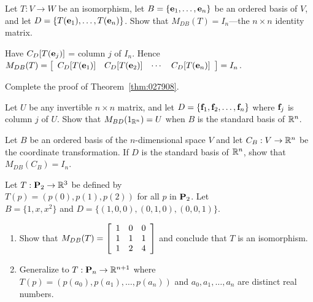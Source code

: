 \begin{multicols}{1}
\begin{ex}
Let $T : V \to W$ be an isomorphism, let $B = \{\textbf{e}_{1}, \dots, \textbf{e}_{n}\}$ be an ordered basis of $V$, and let $D = \{T(\textbf{e}_{1}), \dots, T(\textbf{e}_{n})\}$. Show that $M_{DB}(T) = I_{n}$---the $n\times n$ identity matrix.

\begin{sol}
Have $C_{D}[T(\textbf{e}_{j})]$ = column $j$ of $I_{n}$. Hence $M_{DB}(T) = \left[ \begin{array}{cccc} C_{D}[T(\textbf{e}_{1})] & C_{D}[T(\textbf{e}_{2})] & \cdots & C_{D}[T(\textbf{e}_{n})] \end{array} \right] = I_{n}$.
\end{sol}
\end{ex}

\begin{ex}\label{ex:ex9_1_13}
Complete the proof of Theorem~\ref{thm:027908}.
\end{ex}

\begin{ex}\label{ex:ex9_1_14}
Let $U$ be any invertible $n \times n$ matrix, and let $D = \{\textbf{f}_{1}, \textbf{f}_{2}, \dots, \textbf{f}_{n}\}$ where $\textbf{f}_{j}$ is column $j$ of $U$. Show that $M_{BD}(1_{\mathbb{R}^n}) = U$ when $B$ is the standard basis of $\mathbb{R}^n$.
\end{ex}

\begin{ex}
Let $B$ be an ordered basis of the $n$-dimensional space $V$ and let $C_{B} : V \to \mathbb{R}^n$ be the coordinate transformation. If $D$ is the standard basis of $\mathbb{R}^n$, show that $M_{DB}(C_{B}) = I_{n}$.
\end{ex}

\begin{ex}
Let $T : \textbf{P}_{2} \to \mathbb{R}^3$ be defined by \\ $T(p) = (p(0), p(1), p(2))$ for all $p$ in $\textbf{P}_{2}$. Let \\ $B = \{1, x, x^{2}\}$ and $D = \{(1, 0, 0), (0, 1, 0), (0, 0, 1)\}$.

\begin{enumerate}[label={\alph*.}]
\item Show that $M_{DB}(T) = \left[ \begin{array}{ccc} 1 & 0 & 0 \\ 1 & 1 & 1 \\ 1 & 2 & 4 \end{array} \right]$ and conclude that $T$ is an isomorphism.

\item Generalize to $T : \textbf{P}_{n} \to \mathbb{R}^{n+1}$ where \\ $T(p) = (p(a_{0}), p(a_{1}), \dots, p(a_{n}))$ and $a_{0}, a_{1}, \dots, a_{n}$ are distinct real numbers. 


\end{enumerate}
\end{ex}
\end{multicols}
